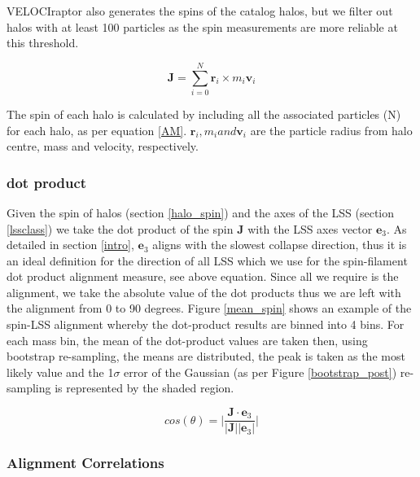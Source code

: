 \documentclass[a4paper,fleqn,usenatbib]{mnras}
\begin{document}
VELOCIraptor also generates the spins of the catalog halos, but we filter out halos with at least 100 particles as the spin measurements are more reliable at this threshold. 
\begin{ceqn}
\begin{equation}
\textbf{J}=\sum_{i=0}^{N}\textbf{r}_i\times m_i\textbf{v}_i \label{AM}
\end{equation}
\end{ceqn}

The spin of each halo is calculated by including all the associated particles (N) for each halo, as per equation \ref{AM}. $\textbf{r}_i,m_i and \textbf{v}_i$ are the particle radius from halo centre, mass and velocity, respectively.

\subsubsection{dot product}

Given the spin of halos (section \ref{halo_spin}) and the axes of the LSS (section \ref{lssclass}) we take the dot product of the spin \textbf{J} with the LSS axes vector $\textbf{e}_{3}$. As detailed in section \ref{intro}, $\textbf{e}_{3}$ aligns with the slowest collapse direction, thus it is an ideal definition for the direction of all LSS which we use for the spin-filament dot product alignment measure, see above equation.
Since all we require is the alignment, we take the absolute value of the dot products thus we are left with the alignment from 0 to 90 degrees. Figure \ref{mean_spin} shows an example of the spin-LSS alignment whereby the dot-product results are binned into 4 bins. For each mass bin, the mean of the dot-product values are taken then, using bootstrap re-sampling, the means are distributed, the peak is taken as the most likely value and the 1$\sigma$ error of the Gaussian (as per Figure \ref{bootstrap_post}) re-sampling is represented by the shaded region. 
\begin{ceqn}
\begin{equation}
cos(\theta)=\bigg|\frac{\textbf{J}\cdot \textbf{e}_{3}}{|\textbf{J}| |\textbf{e}_{3}|}\bigg|\label{dotprod}
\end{equation}
\end{ceqn}

\subsubsection{Alignment Correlations} 
\end{document}
